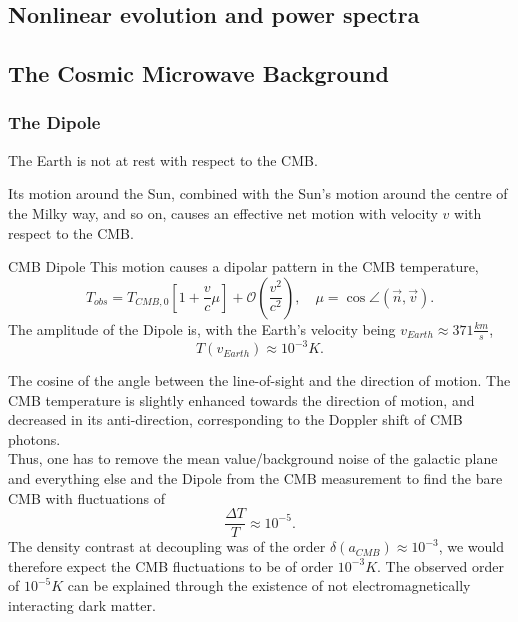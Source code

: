 \subsection{Nonlinear evolution and power spectra}
\subsection{The Cosmic Microwave Background}
\subsubsection{The Dipole}
\begin{mybox}{}
	The Earth is not at rest with respect to the CMB.
\end{mybox}
Its motion around the Sun, combined with the Sun's motion around the centre of the Milky way, and so on, causes an effective net motion with velocity $v$ with respect to the CMB.
\begin{mybox}{CMB Dipole}
	This motion causes a dipolar pattern in the CMB temperature,\begin{equation}
		T_{obs} = T_{CMB,0} \left[1+\frac{v}{c} \mu\right] + \mathcal{O}\left(\frac{v^2}{c^2}\right), \quad \mu = \cos\angle(\vec{n},\vec{v}).
	\end{equation}
	The amplitude of the Dipole is, with the Earth's velocity being $v_{Earth} \approx 371 \frac{km}{s}$,
	\begin{equation*}
		T(v_{Earth}) \approx 10^{-3}K.
	\end{equation*}
\end{mybox}
The cosine of the angle between the line-of-sight and the direction of motion. The CMB temperature is slightly enhanced towards the direction of motion, and decreased in its anti-direction, corresponding to the Doppler shift of CMB photons.\\
Thus, one has to remove the mean value/background noise of the galactic plane and everything else and the Dipole from the CMB measurement to find the bare CMB with fluctuations of
\begin{equation}
	\frac{\Delta T}{T} \approx 10^{-5}.
\end{equation}
The density contrast at decoupling was of the order $\delta(a_{CMB}) \approx 10^{-3}$, we would therefore expect the CMB fluctuations to be of order $10^{-3}K$. The observed order of $10^{-5}K$ can be explained through the existence of not electromagnetically interacting dark matter.
